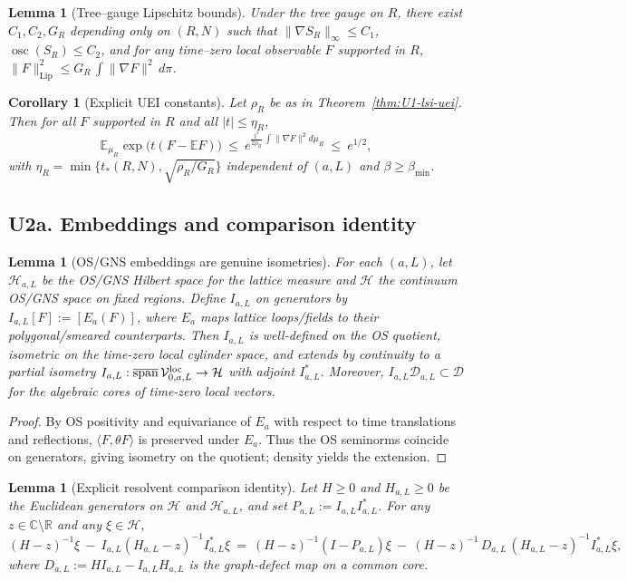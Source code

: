 \documentclass[11pt]{amsart}
\theoremstyle{plain}
\newtheorem{lemma}[theorem]{Lemma}
\newtheorem{corollary}[theorem]{Corollary}
\theoremstyle{definition}
\theoremstyle{remark}
\begin{document}
\begin{lemma}[Tree–gauge Lipschitz bounds]\label{lem:U1-tree-bounds}
Under the tree gauge on $R$, there exist $C_1,C_2,G_R$ depending only on $(R,N)$ such that $\|\nabla S_R\|_{\infty}\le C_1$, $\operatorname{osc}(S_R)\le C_2$, and for any time–zero local observable $F$ supported in $R$, $\|F\|_{\mathrm{Lip}}^2\le G_R\,\int\|\nabla F\|^2\,d\pi$.
\end{lemma}
\begin{corollary}[Explicit UEI constants]\label{cor:U1-uei}
Let $\rho_R$ be as in Theorem~\ref{thm:U1-lsi-uei}. Then for all $F$ supported in $R$ and all $|t|\le \eta_R$,
\[
  \mathbb E_{\mu_R}\exp\big(t(F-\mathbb E F)\big)\ \le\ e^{\tfrac{t^2}{2\rho_R}\,\int\|\nabla F\|^2 d\mu_R}\ \le\ e^{1/2},
\]
with $\eta_R=\min\{t_*(R,N),\sqrt{\rho_R/G_R}\}$ independent of $(a,L)$ and $\beta\ge \beta_{\min}$.
\end{corollary}
\subsection*{U2a. Embeddings and comparison identity}
\begin{lemma}[OS/GNS embeddings are genuine isometries]\label{lem:U2-embeddings}
For each $(a,L)$, let $\mathcal H_{a,L}$ be the OS/GNS Hilbert space for the lattice measure and $\mathcal H$ the continuum OS/GNS space on fixed regions. Define $I_{a,L}$ on generators by $I_{a,L}[F]:=[E_a(F)]$, where $E_a$ maps lattice loops/fields to their polygonal/smeared counterparts. Then $I_{a,L}$ is well-defined on the OS quotient, isometric on the time-zero local cylinder space, and extends by continuity to a partial isometry $I_{a,L}:\overline{\mathrm{span}}\,\mathcal V^{\rm loc}_{0,a,L}\to\mathcal H$ with adjoint $I_{a,L}^*$. Moreover, $I_{a,L}\mathcal D_{a,L}\subset\mathcal D$ for the algebraic cores of time-zero local vectors.
\end{lemma}
\begin{proof}
By OS positivity and equivariance of $E_a$ with respect to time translations and reflections, $\langle F,\theta F\rangle$ is preserved under $E_a$. Thus the OS seminorms coincide on generators, giving isometry on the quotient; density yields the extension.
\end{proof}

\begin{lemma}[Explicit resolvent comparison identity]\label{lem:U2-comparison}
Let $H\ge 0$ and $H_{a,L}\ge 0$ be the Euclidean generators on $\mathcal H$ and $\mathcal H_{a,L}$, and set $P_{a,L}:=I_{a,L}I_{a,L}^*$. For any $z\in\mathbb C\setminus\mathbb R$ and any $\xi\in\mathcal H$,
\[
  (H-z)^{-1}\xi\ -\ I_{a,L}(H_{a,L}-z)^{-1}I_{a,L}^*\xi
  \
  =\ (H-z)^{-1}(I-P_{a,L})\xi\ -\ (H-z)^{-1}\,D_{a,L}\,(H_{a,L}-z)^{-1}I_{a,L}^*\xi,
\]
where $D_{a,L}:=H I_{a,L}-I_{a,L}H_{a,L}$ is the graph-defect map on a common core.
\end{lemma}
\end{document}
